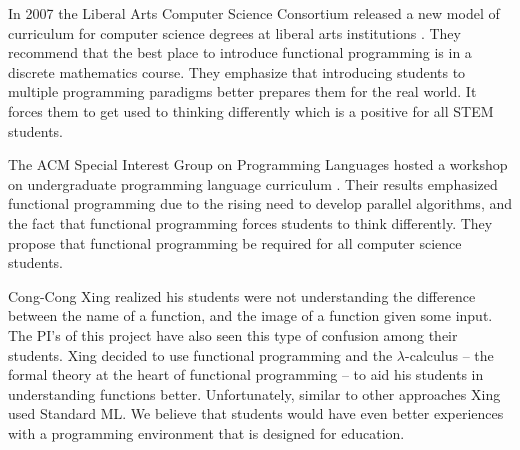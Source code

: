In 2007 the Liberal Arts Computer Science Consortium released a new
model of curriculum for computer science degrees at liberal arts
institutions \cite{LiberalArtsComputerScienceConsortium:2007}.  They
recommend that the best place to introduce functional programming is
in a discrete mathematics course.  They emphasize that introducing
students to multiple programming paradigms better prepares them for
the real world. It forces them to get used to thinking differently
which is a positive for all STEM students.

The ACM Special Interest Group on Programming Languages hosted a
workshop on undergraduate programming language curriculum
\cite{Allen:2008}.  Their results emphasized functional programming
due to the rising need to develop parallel algorithms, and the fact
that functional programming forces students to think differently.
They propose that functional programming be required for all computer
science students.

Cong-Cong Xing \cite{Xing:2008} realized his students were not
understanding the difference between the name of a function, and the
image of a function given some input.  The PI's of this project have
also seen this type of confusion among their students.  Xing decided
to use functional programming and the $\lambda$-calculus -- the formal
theory at the heart of functional programming -- to aid his students
in understanding functions better. Unfortunately, similar to other
approaches Xing used Standard ML.  We believe that students would have
even better experiences with a programming environment that is
designed for education.

